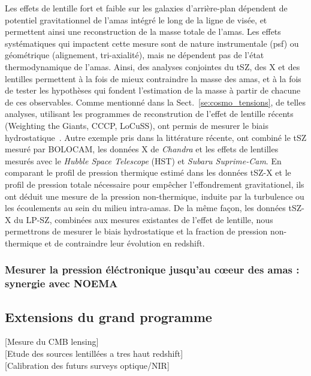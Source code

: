 Les effets de lentille fort et faible sur les galaxies d'arrière-plan
dépendent de potentiel gravitationnel de l'amas intégré le long de la
ligne de visée, et permettent ainsi une reconstruction de la masse
totale de l'amas. Les effets systématiques qui impactent cette mesure
sont de nature instrumentale (psf) ou géométrique (alignement,
tri-axialité), mais ne dépendent pas de l'état thermodynamique de
l'amas. Ainsi, des analyses conjointes du tSZ, des X et des lentilles
permettent à la fois de mieux contraindre la masse des amas, et à la
fois de tester les hypothèses qui fondent l'estimation de la masse à
partir de chacune de ces observables. Comme mentionné dans la
Sect.~\ref{se:cosmo_tensions}, de telles analyses, utilisant les
programmes de reconstrution de l'effet de lentille récents (Weighting
the Giants, CCCP, LoCuSS), ont permis de mesurer le biais
hydrostatique~\citep[voir][pour une compilation des
  résultats]{Salvati2018}. Autre exemple pris dans la littérature
récente, \citet{Siegel2018} ont combiné le tSZ mesuré par BOLOCAM, les
données X de \emph{Chandra} et les effets de lentilles mesurés avec le
\emph{Hubble Space Telescope} (HST) et \emph{Subaru Suprime-Cam}. En
comparant le profil de pression thermique estimé dans les données
tSZ-X et le profil de pression totale nécessaire pour empêcher
l'effondrement gravitationel, ils ont déduit une mesure de la pression
non-thermique, induite par la turbulence ou les écoulements au sein du
milieu intra-amas. De la même façon, les données tSZ-X du LP-SZ,
combinées aux mesures existantes de l'effet de lentille, nous
permettrons de mesurer le biais hydrostatique et la fraction de pression
non-thermique et de contraindre leur évolution en redshift.  

\subsubsection{Mesurer la pression éléctronique jusqu'au c\oe eur des
  amas : synergie avec NOEMA }


\subsection{Extensions du grand programme}

[Mesure du CMB lensing]\\

[Etude des sources lentillées a tres haut redshift]\\

[Calibration des futurs surveys optique/NIR]\\

